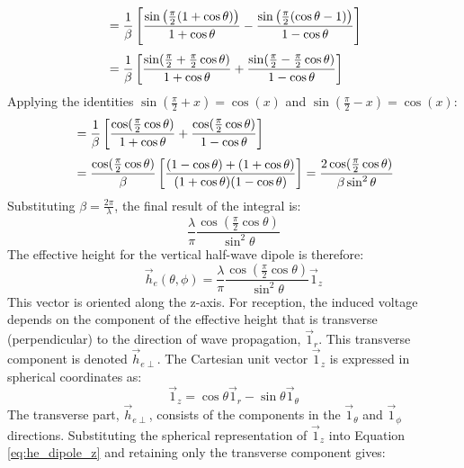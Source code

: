 \begin{align}
    &= \frac{1}{\beta} \left[ \frac{\sin\left(\frac{\pi}{2}(1+\cos\theta)\right)}{1+\cos\theta} - \frac{\sin\left(\frac{\pi}{2}(\cos\theta-1)\right)}{1-\cos\theta} \right] \\[\jot]
    &= \frac{1}{\beta} \left[ \frac{\sin(\frac{\pi}{2}+\frac{\pi}{2}\cos\theta)}{1+\cos\theta} + \frac{\sin(\frac{\pi}{2}-\frac{\pi}{2}\cos\theta)}{1-\cos\theta} \right]
\end{align}
\vspace{1em}
Applying the identities $\sin(\frac{\pi}{2}+x) = \cos(x)$ and $\sin(\frac{\pi}{2}-x) = \cos(x)$:
\vspace{1em}
\begin{align}
    &= \frac{1}{\beta} \left[ \frac{\cos(\frac{\pi}{2}\cos\theta)}{1+\cos\theta} + \frac{\cos(\frac{\pi}{2}\cos\theta)}{1-\cos\theta} \right] \\[\jot]
    &= \frac{\cos(\frac{\pi}{2}\cos\theta)}{\beta} \left[ \frac{(1-\cos\theta) + (1+\cos\theta)}{(1+\cos\theta)(1-\cos\theta)} \right] = \frac{2\cos(\frac{\pi}{2}\cos\theta)}{\beta\sin^2\theta}
\end{align}
\vspace{1em}
Substituting $\beta=\frac{2\pi}{\lambda}$, the final result of the integral is:
\begin{equation}
    \frac{\lambda}{\pi} \frac{\cos(\frac{\pi}{2}\cos\theta)}{\sin^2\theta}
\end{equation}
\vspace{0.5em}
The effective height for the vertical half-wave dipole is therefore:
\begin{equation}
    \vec{h}_e(\theta, \phi) = \frac{\lambda}{\pi} \frac{\cos(\frac{\pi}{2}\cos\theta)}{\sin^2\theta} \vec{1}_z
    \label{eq:he_dipole_z}
\end{equation}
\vspace{0.5em}
This vector is oriented along the z-axis. For reception, the induced voltage depends on the component of the effective height that is transverse (perpendicular) to the direction of wave propagation, $\vec{1}_r$. This transverse component is denoted $\vec{h}_{e\perp}$. The Cartesian unit vector $\vec{1}_z$ is expressed in spherical coordinates as:
\begin{equation}
    \vec{1}_z = \cos\theta \vec{1}_r - \sin\theta \vec{1}_\theta
\end{equation}
\vspace{0.5em}
The transverse part, $\vec{h}_{e\perp}$, consists of the components in the $\vec{1}_\theta$ and $\vec{1}_\phi$ directions. Substituting the spherical representation of $\vec{1}_z$ into Equation \ref{eq:he_dipole_z} and retaining only the transverse component gives:
